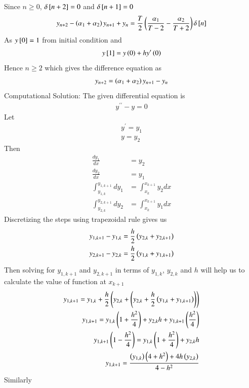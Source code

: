 \documentclass[journal]{IEEEtran}
\begin{document}
Since $n\ge 0$, $\delta{}\left[n+2\right] = 0$ and $\delta{}\left[n+1\right] = 0$
\begin{align}
	 y_{n+2}-\left(\alpha_1+\alpha_2\right)y_{n+1}+y_n = \frac{T}{2}\left(\frac{\alpha_1}{T-2}-\frac{\alpha_2}{T+2}\right)\delta{}\left[n\right]
\end{align}
As $y{}\left[0\right] = 1$ from initial condition and
\begin{align}
y{}\left[1\right]=y\left(0\right) + hy^\prime\left(0\right)\\
\end{align}
Hence $n\ge 2$ which gives the difference equation as
\begin{align}
	y_{n+2} = \left(\alpha_1+\alpha_2\right)y_{n+1} - y_n
\end{align}
Computational Solution:\newline
The given differential equation is
\begin{align}
	y^{\prime\prime} - y = 0
\end{align}
Let
\begin{align}
	y^\prime = y_1\\
	y = y_2
\end{align}
Then
\begin{align}
	\frac{dy_1}{dx} &= y_2\\
	\frac{dy_2}{dx} &= y_1\\
	\int_{y_{1,k}}^{y_{1,k+1}}dy_1 &= \int_{x_k}^{x_{k+1}}y_2dx\\
	\int_{y_{2,k}}^{y_{2,k+1}}dy_2 &= \int_{x_k}^{x_{k+1}}y_1dx
\end{align}
Discretizing the steps using trapezoidal rule gives us
\begin{align}
	y_{1,k+1} - y_{1,k} = \frac{h}{2}\left(y_{2,k}+y_{2,k+1}\right)\\
	y_{2,k+1} - y_{2,k} = \frac{h}{2}\left(y_{1,k}+y_{1,k+1}\right)
\end{align}
Then solving for $y_{1,k+1}$ and $y_{2,k+1}$ in terms of $y_{1,k}$, $y_{2,k}$ and $h$ will help us to calculate the value of function at $x_{k+1}$
\begin{align}
	y_{1,k+1} = y_{1,k} + \frac{h}{2}\left(y_{2,k}+\left(y_{2,k}+\frac{h}{2}\left(y_{1,k}+y_{1,k+1}\right)\right)\right)\\
	y_{1,k+1} = y_{1,k}\left(1+\frac{h^2}{4}\right) + y_{2,k}h + y_{1,k+1}\left(\frac{h^2}{4}\right)\\
	y_{1,k+1}\left(1-\frac{h^2}{4}\right) = y_{1,k}\left(1+\frac{h^2}{4}\right) + y_{2,k}h\\
	y_{1,k+1} = \frac{\left(y_{1,k}\right)\left(4+h^2\right)+4h\left(y_{2,k}\right)}{4-h^2}
\end{align}
Similarly
\end{document}

